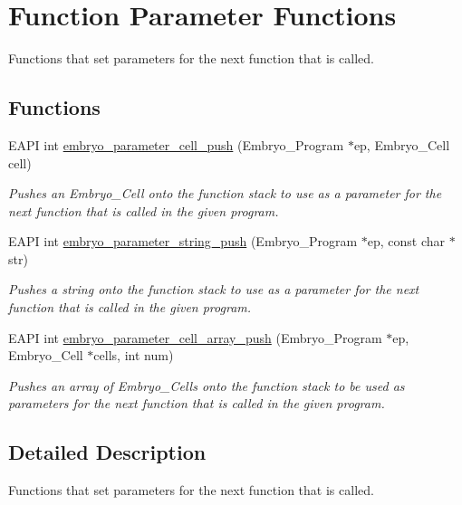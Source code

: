 \hypertarget{group__Embryo__Parameter__Group}{
\section{Function Parameter Functions}
\label{group__Embryo__Parameter__Group}
}
Functions that set parameters for the next function that is called.  
\subsection*{Functions}
\begin{CompactItemize}
\item 
EAPI int \hyperlink{group__Embryo__Parameter__Group_g1e0efa3807b52a3104eb229f7b389698}{embryo\_\-parameter\_\-cell\_\-push} (Embryo\_\-Program $\ast$ep, Embryo\_\-Cell cell)
\begin{CompactList}\small\item\em Pushes an Embryo\_\-Cell onto the function stack to use as a parameter for the next function that is called in the given program. \item\end{CompactList}\item 
EAPI int \hyperlink{group__Embryo__Parameter__Group_gf10dc40b19efee3aaa23e9ba71372721}{embryo\_\-parameter\_\-string\_\-push} (Embryo\_\-Program $\ast$ep, const char $\ast$str)
\begin{CompactList}\small\item\em Pushes a string onto the function stack to use as a parameter for the next function that is called in the given program. \item\end{CompactList}\item 
EAPI int \hyperlink{group__Embryo__Parameter__Group_g3db70dbfb48a2792138d24cfff51d20c}{embryo\_\-parameter\_\-cell\_\-array\_\-push} (Embryo\_\-Program $\ast$ep, Embryo\_\-Cell $\ast$cells, int num)
\begin{CompactList}\small\item\em Pushes an array of Embryo\_\-Cells onto the function stack to be used as parameters for the next function that is called in the given program. \item\end{CompactList}\end{CompactItemize}


\subsection{Detailed Description}
Functions that set parameters for the next function that is called. 



